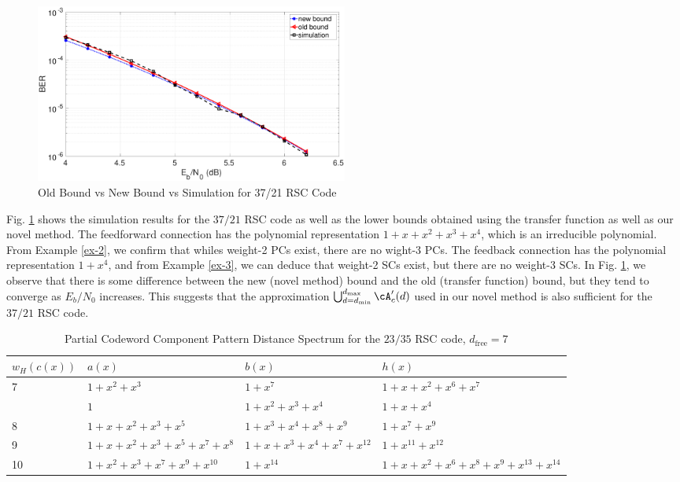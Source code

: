 \begin{figure}[htbp]
\centering
		\includegraphics[width=0.5\textwidth]{./Images/RSC_37_21_lower_weights.eps}
		\caption{Old Bound vs New Bound vs Simulation for 37/21 RSC Code}
		\label{simFig2}
		\end{figure}
Fig. \ref{simFig2} shows the simulation results for the $37/21$ RSC code as well as the lower bounds obtained using the transfer function as well as our novel method. The feedforward connection has the polynomial representation $1+x+x^2+x^3+x^4$, which is an irreducible polynomial. From Example \ref{ex-2}, we confirm that whiles weight-2 PCs exist, there are no wight-3 PCs. The feedback connection has the polynomial representation $1+x^4$, and from Example \ref{ex-3}, we can deduce that weight-2 SCs exist, but there are no weight-3 SCs. In Fig. \ref{simFig2}, we observe that there is some difference between the new (novel method) bound and the old (transfer function) bound, but they tend to converge as $E_b/N_0$ increases. This suggests that the approximation $ \bigcup_{d = d_{\text{min}}}^{d_{\text{max}}} \cA'_c(d) $ used in our novel method is also sufficient for the $37/21$ RSC code.

\begin{table}[htbp]
 \caption{Partial Codeword Component Pattern Distance Spectrum for the $23/35$ RSC code, $d_{\text{free}}=7$}
\centering
\begin{tabularx}{0.75\textwidth}{lXlX} 
 \hline
$w_H(c(x))$ & $a(x)$ & $b(x)$ & $h(x)$ \\ [0.5ex] 
 \hline\hline
7&$1+x^2+x^3$ & $1+x^7$ & $1+x+x^2+x^6+x^7$\\
\hline
&$1$ & $1+x^2+x^3+x^4$ & $1+x+x^{4}$\\
\hline \hline
8&$1+x+x^2+x^3+x^5$ & $1+x^3+x^4+x^8+x^9$ & $1+x^7+x^9$\\
\hline\hline
9&$1+x+x^2+x^3+x^5+x^7+x^8$ & $1+x+x^3+x^4+x^7+x^{12}$ & $1+x^{11}+x^{12}$\\
\hline\hline
10&$1+x^2+x^3+x^7+x^9+x^{10}$ & $1+x^{14}$ & $1+x+x^2+x^6+x^8+x^9+x^{13}+x^{14}$\\
\hline
 \end{tabularx}
 
 \label{novelTab15}
\end{table}

